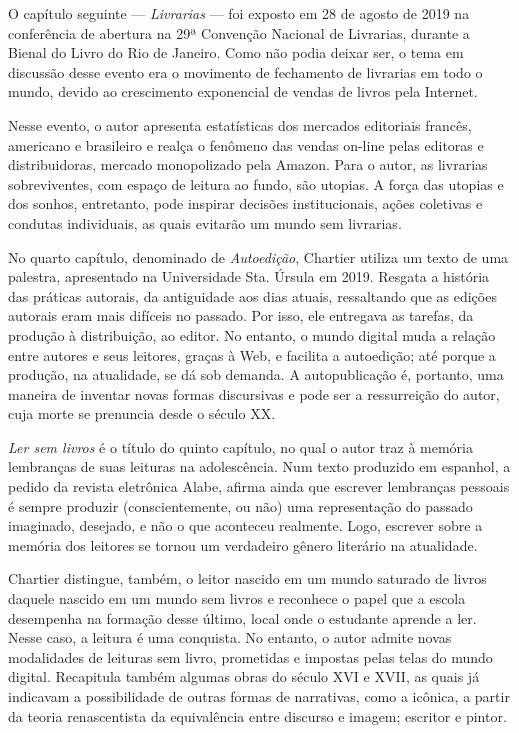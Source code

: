 \documentclass[portuguese]{textolivre}
\begin{document}
O capítulo seguinte — \emph{Livrarias} — foi exposto em 28 de agosto de 2019 na conferência de abertura na 29ª Convenção Nacional de Livrarias, durante a Bienal do Livro do Rio de Janeiro. Como não podia deixar ser, o tema em discussão desse evento era o movimento de fechamento de livrarias em todo o mundo, devido ao crescimento exponencial de vendas de livros pela Internet.

Nesse evento, o autor apresenta estatísticas dos mercados editoriais francês, americano e brasileiro e realça o fenômeno das vendas on-line pelas editoras e distribuidoras, mercado monopolizado pela Amazon. Para o autor, as livrarias sobreviventes, com espaço de leitura ao fundo, são utopias. A força das utopias e dos sonhos, entretanto, pode inspirar decisões institucionais, ações coletivas e condutas individuais, as quais evitarão um mundo sem livrarias.

No quarto capítulo, denominado de \emph{Autoedição}, Chartier utiliza um texto de uma palestra, apresentado na Universidade Sta. Úrsula em 2019. Resgata a história das práticas autorais, da antiguidade aos dias atuais, ressaltando que as edições autorais eram mais difíceis no passado. Por isso, ele entregava as tarefas, da produção à distribuição, ao editor. No entanto, o mundo digital muda a relação entre autores e seus leitores, graças à Web, e facilita a autoedição; até porque a produção, na atualidade, se dá sob demanda. A autopublicação é, portanto, uma maneira de inventar novas formas discursivas e pode ser a ressurreição do autor, cuja morte se prenuncia desde o século XX.

\emph{Ler sem livros} é o título do quinto capítulo, no qual o autor traz à memória lembranças de suas leituras na adolescência. Num texto produzido em espanhol, a pedido da revista eletrônica Alabe, afirma ainda que escrever lembranças pessoais é sempre produzir (conscientemente, ou não) uma representação do passado imaginado, desejado, e não o que aconteceu realmente. Logo, escrever sobre a memória dos leitores se tornou um verdadeiro gênero literário na atualidade.

Chartier distingue, também, o leitor nascido em um mundo saturado de livros daquele nascido em um mundo sem livros e reconhece o papel que a escola desempenha na formação desse último, local onde o estudante aprende a ler. Nesse caso, a leitura é uma conquista. No entanto, o autor admite novas modalidades de leituras sem livro, prometidas e impostas pelas telas do mundo digital. Recapitula também algumas obras do século XVI e XVII, as quais já indicavam a possibilidade de outras formas de narrativas, como a icônica, a partir da teoria renascentista da equivalência entre discurso e imagem; escritor e pintor.
\end{document}
